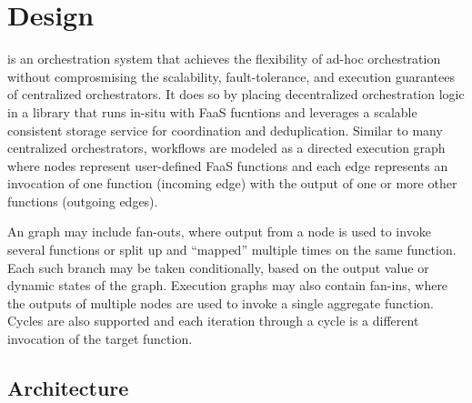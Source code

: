 \section{\name{} Design}\label{sec:design}

\name{} is an orchestration system that achieves the flexibility of ad-hoc
orchestration without comprosmising the scalability, fault-tolerance, and
execution guarantees of centralized orchestrators. It does so by placing
decentralized orchestration logic in a library that runs in-situ with FaaS
fucntions and leverages a scalable consistent storage service for coordination
and deduplication. Similar to many centralized orchestrators, \name{} workflows
are modeled as a directed execution graph where nodes represent user-defined
FaaS functions and each edge represents an invocation of one function (incoming
edge) with the output of one or more other functions (outgoing edges).

An \name{} graph may include fan-outs, where output from a node is used to
invoke several functions or split up and ``mapped'' multiple times on the same
function. Each such branch may be taken conditionally, based on the output value
or dynamic states of the graph. Execution graphs may also contain fan-ins, where
the outputs of multiple nodes are used to invoke a single aggregate function.
Cycles are also supported and each iteration through a cycle is a different
invocation of the target function.

\subsection{Architecture}\label{sec:design:architecture}

